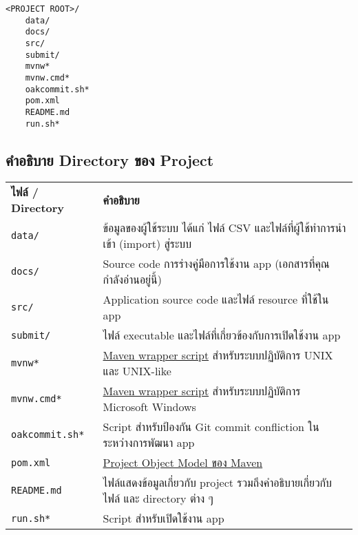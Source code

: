 \documentclass[../docs.tex]{subfiles}
\begin{document}
\setlength{\parindent}{0em}
\setlength{\columnsep}{2pt}
\begin{lstlisting}[name={โครงสร้าง Directory ของ Project},numbers=none]
<PROJECT ROOT>/
    data/
    docs/
    src/
    submit/
    mvnw*
    mvnw.cmd*
    oakcommit.sh*
    pom.xml
    README.md
    run.sh*
\end{lstlisting}

\subsection*{คำอธิบาย Directory ของ Project}

\begin{tabularx}{\textwidth}{ @{} p{6em} @{} p{\textwidth-8em} @{} }
\textbf{ไฟล์ / Directory}    & \textbf{คำอธิบาย} \\
\texttt{data/}              & ข้อมูลของผู้ใช้ระบบ ได้แก่ ไฟล์ CSV และไฟล์ที่ผู้ใช้ทำการนำเข้า (import) สู่ระบบ \\
\texttt{docs/}              & Source code การร่างคู่มือการใช้งาน app (เอกสารที่คุณกำลังอ่านอยู่นี้) \\
\texttt{src/}               & Application source code และไฟล์ resource ที่ใช้ใน app \\
\texttt{submit/}            & ไฟล์ executable และไฟล์ที่เกี่ยวข้องกับการเปิดใช้งาน app \\
\texttt{mvnw*}              & \href{https://maven.apache.org/wrapper/}{Maven wrapper script} สําหรับระบบปฏิบัติการ UNIX และ UNIX-like \\
\texttt{mvnw.cmd*}          & \href{https://maven.apache.org/wrapper/}{Maven wrapper script} สําหรับระบบปฏิบัติการ Microsoft Windows \\
\texttt{oakcommit.sh*}      & Script สำหรับป้องกัน Git commit confliction ในระหว่างการพัฒนา app \\
\texttt{pom.xml}            & \href{https://maven.apache.org/guides/introduction/introduction-to-the-pom.html}{Project Object Model ของ Maven} \\
\texttt{README.md}          & ไฟล์แสดงข้อมูลเกี่ยวกับ project รวมถึงคำอธิบายเกี่ยวกับไฟล์ และ directory ต่าง ๆ \\
\texttt{run.sh*}            & Script สำหรับเปิดใช้งาน app
\end{tabularx}
\end{document}
